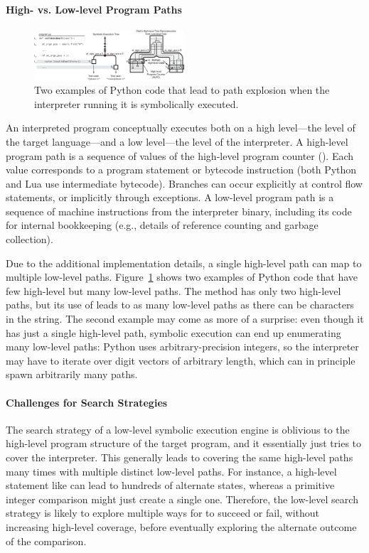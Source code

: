 \paragraph{High- vs. Low-level Program Paths}

\begin{figure}
  \centering
  \includegraphics[width=2.2in]{figures/chef/running-example}
  \caption{Two examples of Python code that lead to path explosion when the interpreter running it is symbolically executed.}
  \label{fig:running-examples}
\end{figure}


An interpreted program conceptually executes both on a high level---the level of the target language---and a low level---the level of the interpreter.
%
A high-level program path is a sequence of values of the high-level program counter (\hlpc). Each \hlpc value corresponds to a program statement or bytecode instruction (both Python and Lua use intermediate bytecode).  Branches can occur explicitly at control flow statements, or implicitly through exceptions.
%
A low-level program path is a sequence of machine instructions from the interpreter binary, including its code for internal bookkeeping (e.g., details of reference counting and garbage collection).

Due to the additional implementation details, a single high-level path can map to multiple low-level paths.
%
Figure~\ref{fig:running-examples} shows two examples of Python code that have few high-level but many low-level paths. The  method has only two high-level paths, but its use of  leads to as many low-level paths as there can be characters in the  string.
%
The second example  may come as more of a surprise: even though it has just a single high-level path, symbolic execution can end up enumerating many low-level paths: Python uses arbitrary-precision integers, so the interpreter may have to iterate over digit vectors of arbitrary length, which can in principle spawn arbitrarily many paths.


\paragraph{Challenges for Search Strategies}
%
The search strategy of a low-level symbolic execution engine is oblivious to the high-level program structure of the target program, and it essentially just tries to cover the interpreter. This generally leads to covering the same high-level paths many times with multiple distinct low-level paths.
%
For instance, a high-level statement like  can lead to hundreds of alternate states, whereas a primitive integer comparison might just create a single one. Therefore, the low-level search strategy is likely to explore multiple ways for  to succeed or fail, without increasing high-level coverage, before eventually exploring the alternate outcome of the comparison.


